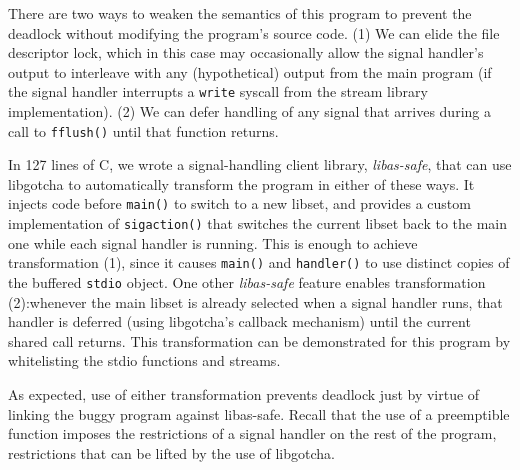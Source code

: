 There are two ways to weaken the semantics of this program to prevent the deadlock
without modifying the program's source code.  (1) We can elide the file descriptor
lock, which in this case may occasionally allow the signal handler's output to
interleave with any (hypothetical) output from the main program (if the signal
handler interrupts a \texttt{write} syscall from the stream library implementation).
(2) We can defer handling of any signal that arrives during a call to
\texttt{fflush()} until that function returns.

In 127 lines of C, we wrote a signal-handling client library, \textit{libas-safe},
that can use libgotcha to automatically transform the program in either of these
ways.  It injects code before \texttt{main()} to switch to a new libset, and
provides a custom implementation of \texttt{sigaction()} that switches the current
libset back to the main one while each signal handler is running.  This is enough to
achieve transformation (1), since it causes \texttt{main()} and \texttt{handler()} to
use distinct copies of the buffered \texttt{stdio} object.  One other
\textit{libas-safe} feature enables transformation (2):\@ whenever the main libset is
already selected when a signal handler runs, that handler is deferred (using
libgotcha's callback mechanism) until the current shared call returns.  This
transformation can be demonstrated for this program by whitelisting the stdio
functions and streams.

As expected, use of either transformation prevents deadlock just by virtue of linking
the buggy program against libas-safe.  Recall that the use of a preemptible function
imposes the restrictions of a signal handler on the rest of the program, restrictions
that can be lifted by the use of libgotcha.
